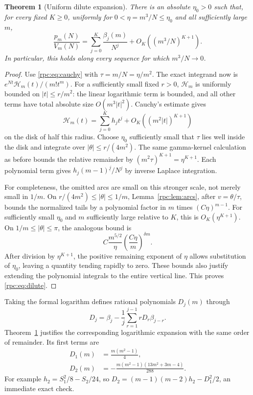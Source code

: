 \documentclass[11pt]{article}
\newtheorem{theorem}{Theorem}[section]
\theoremstyle{definition}
\theoremstyle{remark}
\newcommand{\fall}[2]{#1^{\underline{#2}}}
\numberwithin{equation}{section}
\begin{document}
\begin{theorem}[Uniform dilute expansion]\label{rpc:thm:dilute}
There is an absolute $\eta_0>0$ such that, for every fixed $K\ge0$, uniformly
for $0<\eta=m^3/N\le\eta_0$ and all sufficiently large $m$,
\begin{equation}\label{rpc:eq:dilute}
 \frac{p_m(N)}{V_m(N)}
   =\sum_{j=0}^K\frac{\beta_j(m)}{N^j}
      +O_K\!\left((m^3/N)^{K+1}\right).
\end{equation}
In particular, this holds along every sequence for which $m^3/N\to0$.
\end{theorem}
\begin{proof}
Use \eqref{rpc:eq:cauchy} with $\tau=m/N=\eta/m^2$. The exact integrand now is
$e^{Nt}\mathcal H_m(t)/(m!t^m)$. For a sufficiently small fixed $r>0$,
$\mathcal H_m$ is uniformly bounded on $|t|\le r/m^2$: the linear logarithmic
term is bounded, and all other terms have total absolute size $O(m^3|t|^2)$.
Cauchy's estimate gives
\[
 \mathcal H_m(t)=\sum_{j=0}^K h_jt^j
                   +O_K((m^2|t|)^{K+1})
\]
on the disk of half this radius. Choose $\eta_0$ sufficiently small that
$\tau$ lies well inside the disk and integrate over
$|\theta|\le r/(4m^2)$. The same gamma-kernel calculation as before bounds
the relative remainder by
$(m^2\tau)^{K+1}=\eta^{K+1}$. Each polynomial term gives
$h_j\fall{(m-1)}j/N^j$ by inverse Laplace integration.

For completeness, the omitted arcs are small on this stronger scale, not
merely small in $1/m$. On $r/(4m^2)\le|\theta|\le1/m$,
Lemma~\ref{rpc:lem:arcs}, after $v=\theta/\tau$, bounds the normalized tails
by a polynomial factor in $m$ times $(C\eta)^{m-1}$. For sufficiently small
$\eta_0$ and $m$ sufficiently large relative to $K$, this is
$O_K(\eta^{K+1})$. On $1/m\le|\theta|\le\pi$, the analogous bound is
\[
 C\frac{m^{5/2}}{\eta}\left(\frac{C\eta}{m}\right)^{\delta m}.
\]
After division by $\eta^{K+1}$, the positive remaining exponent of $\eta$
allows substitution of $\eta_0$, leaving a quantity tending rapidly to zero.
These bounds also justify extending the polynomial integrals to the entire
vertical line. This proves \eqref{rpc:eq:dilute}.
\end{proof}

Taking the formal logarithm defines rational polynomials $D_j(m)$ through
\begin{equation}\label{rpc:eq:D-rec}
 D_j=\beta_j-\frac1j\sum_{r=1}^{j-1}rD_r\beta_{j-r}.
\end{equation}
Theorem~\ref{rpc:thm:dilute} justifies the corresponding logarithmic expansion
with the same order of remainder. Its first terms are
\begin{align}
 D_1(m)&=\frac{m(m^2-1)}4,\label{rpc:eq:D1}\\
 D_2(m)&=-\frac{m(m^2-1)(13m^2+3m-4)}{288}.\label{rpc:eq:D2}
\end{align}
For example $h_2=S_1^2/8-S_2/24$, so
$D_2=(m-1)(m-2)h_2-D_1^2/2$, an immediate exact check.
\end{document}
